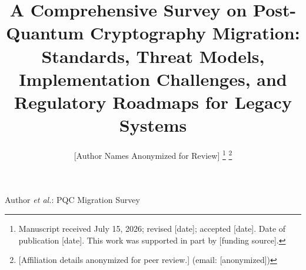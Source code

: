 \documentclass[journal]{IEEEtran}
\begin{document}

\title{A Comprehensive Survey on Post-Quantum Cryptography Migration:\\
Standards, Threat Models, Implementation Challenges, and\\
Regulatory Roadmaps for Legacy Systems}

\author{[Author Names Anonymized for Review]%
\thanks{Manuscript received July 15, 2026; revised [date]; accepted [date]. Date of publication [date]. This work was supported in part by [funding source].}%
\thanks{[Affiliation details anonymized for peer review.] (email: [anonymized])}
}

%
{Author \MakeLowercase{\textit{et al.}}: PQC Migration Survey}

\maketitle
\end{document}
